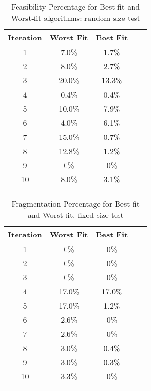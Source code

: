 \begin{table}[htbp]
    \centering
    \caption{Feasibility Percentage for Best-fit and Worst-fit algorithms: random size test}
    \begin{tabular}{@{}ccccc@{}}
    \toprule
    \textbf{Iteration} & \textbf{Worst Fit} & \textbf{Best Fit} \\ \midrule
    1 & 7.0\% & 1.7\% \\
    2 & 8.0\% & 2.7\% \\
    3 & 20.0\% & 13.3\% \\
    4 & 0.4\% & 0.4\% \\
    5 & 10.0\% & 7.9\% \\
    6 & 4.0\% & 6.1\% \\
    7 & 15.0\% & 0.7\% \\
    8 & 12.8\% & 1.2\% \\
    9 & 0\% & 0\% \\
    10 & 8.0\% & 3.1\% \\ \bottomrule
    \label{tab:random test}
    \end{tabular}
\end{table}


\begin{table}[htbp]
    \centering
    \caption{Fragmentation Percentage for Best-fit and Worst-fit: fixed size test}
    \begin{tabular}{@{}ccccc@{}}
    \toprule
    \textbf{Iteration} & \textbf{Worst Fit} & \textbf{Best Fit} \\ \midrule
    1 & 0\% & 0\% \\
    2 & 0\% & 0\% \\
    3 & 0\% & 0\% \\
    4 & 17.0\% & 17.0\% \\
    5 & 17.0\% & 1.2\% \\
    6 & 2.6\% & 0\% \\
    7 & 2.6\% & 0\% \\
    8 & 3.0\% & 0.4\% \\
    9 & 3.0\% & 0.3\% \\
    10 & 3.3\% & 0\% \\ \bottomrule
    \label{tab:fixed test}
\end{tabular}
\end{table}
